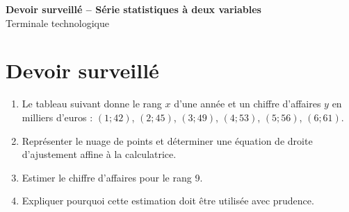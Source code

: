 \documentclass[french,11pt]{book}
\begin{document}
\begin{center}
{\Large \textbf{Devoir surveillé -- Série statistiques à deux variables}}\\[2mm]
Terminale technologique
\end{center}

\section*{Devoir surveillé}
\begin{enumerate}
  \item Le tableau suivant donne le rang $x$ d'une année et un chiffre d'affaires $y$ en milliers d'euros : $(1;42)$, $(2;45)$, $(3;49)$, $(4;53)$, $(5;56)$, $(6;61)$.
  \item Représenter le nuage de points et déterminer une équation de droite d'ajustement affine à la calculatrice.
  \item Estimer le chiffre d'affaires pour le rang 9.
  \item Expliquer pourquoi cette estimation doit être utilisée avec prudence.
\end{enumerate}
\end{document}

